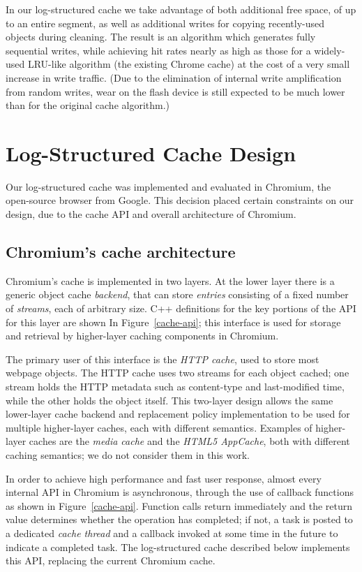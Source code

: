 \documentclass[letterpaper,twocolumn,10pt]{article}
\begin{document}
In our log-structured cache we take advantage of both additional free
space, of up to an entire segment, as well as additional writes for
copying recently-used objects during cleaning. The result is an
algorithm which generates fully sequential writes, while achieving hit
rates nearly as high as those for a widely-used LRU-like algorithm
(the existing Chrome cache) at the cost of a very small increase in write
traffic. (Due to the elimination of internal write amplification from
random writes, wear on the flash device is still expected to be much
lower than for the original cache algorithm.)

\section{Log-Structured Cache Design}

Our log-structured cache was implemented and evaluated in Chromium, the
open-source browser from Google.  This decision placed certain constraints on
our design, due to the cache API and overall architecture of Chromium.

\subsection{Chromium's cache architecture}

Chromium's cache is implemented in two layers.  At the lower layer there is a
generic object cache \emph{backend}, that can store \emph{entries} consisting of
a fixed number of \emph{streams}, each of arbitrary size.  C++ definitions for
the key portions of the API for this layer are shown In Figure~\ref{cache-api};
this interface is used for storage and retrieval by higher-layer caching
components in Chromium.

The primary user of this interface is the \emph{HTTP cache}, used to store most
webpage objects. The HTTP cache uses two streams for each object cached; one
stream holds the HTTP metadata such as content-type and last-modified time,
while the other holds the object itself.  This two-layer design allows the same
lower-layer cache backend and replacement policy implementation to be used for
multiple higher-layer caches, each with different semantics.  Examples of
higher-layer caches are the \emph{media cache} and the \emph{HTML5 AppCache},
both with different caching semantics; we do not consider them in this work.

In order to achieve high performance and fast user response, almost every
internal API in Chromium is asynchronous, through the use of callback functions
as shown in Figure~\ref{cache-api}.  Function calls return immediately and the
return value determines whether the operation has completed; if not, a task is
posted to a dedicated \emph{cache thread} and a callback invoked at some time in
the future to indicate a completed task.  The log-structured cache described
below implements this API, replacing the current Chromium cache.
\end{document}
